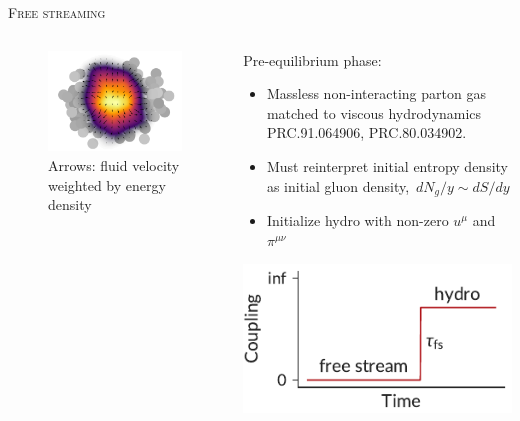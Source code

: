 \documentclass[aspectratio=169]{beamer}
\begin{document}
\begin{frame}[t]{\scshape Free streaming}
  \begin{columns}[T]
    \begin{column}{.5\textwidth}
      \begin{figure}
        \includegraphics[width=\textwidth]{trento_freestream}\\
        \small Arrows: fluid velocity\\weighted by energy density
      \end{figure}
    \end{column}
    \begin{column}{.5\textwidth}
      \bigskip \centering
      \textcolor{theme}{Pre-equilibrium phase:}
      \begin{itemize}
        \small
        \item Massless non-interacting parton gas matched to viscous hydrodynamics
          \textcolor{theme}{\scriptsize PRC.91.064906, PRC.80.034902}.
        \item Must reinterpret initial entropy density as initial gluon density,\,
          $dN_g/y \sim dS/dy$
        \item Initialize hydro with non-zero $u^\mu$ and $\pi^{\mu\nu}$
      \end{itemize}
      \medskip
      \includegraphics{coupling}
    \end{column}
  \end{columns}
\end{frame}
\end{document}
